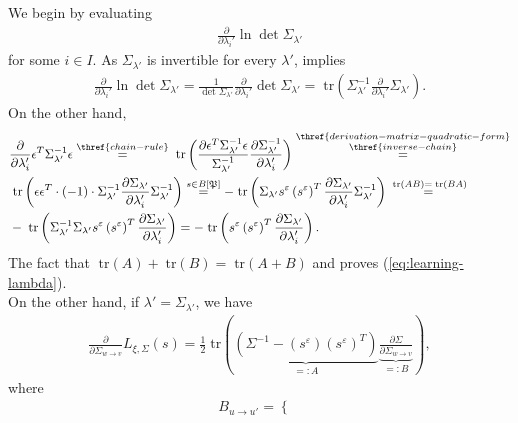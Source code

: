 \documentclass[a4paper,11pt]{report}
\newcommand{\tr}{\;\text{tr}}
\begin{document}
\begin{Bew}
We begin by evaluating
\begin{align*}
\frac{\partial}{\partial\lambda_i'}\ln\det\Sigma_{\lambda'}
\end{align*}
for some $i\in I$. As $\Sigma_{\lambda'}$ is invertible for every $\lambda'$,  implies
\begin{align*}
\frac{\partial}{\partial\lambda_i'}\ln\det\Sigma_{\lambda'}=\frac{1}{\det\Sigma_{\lambda'}}\frac{\partial}{\partial\lambda_i'}\det\Sigma_{\lambda'}=\tr\left(\Sigma_{\lambda'}^{-1}\frac{\partial}{\partial\lambda_i'}\Sigma_{\lambda'}\right).
\end{align*}
On the other hand,
\begin{align*}
&\frac{\partial}{\partial\lambda_i'}\epsilon^T\Sigma_{\lambda'}^{-1}\epsilon\overset{\thref{chain-rule}}{=}
\tr\left(\frac{\partial\epsilon^T\Sigma_{\lambda'}^{-1}\epsilon}{\Sigma^{-1}_{\lambda'}}\frac{\partial\Sigma^{-1}_{\lambda'}}{\partial\lambda_i'}\right)
\overset{\substack{\thref{derivation-matrix-quadratic-form}\\\thref{inverse-chain}}}{=}\\
&\tr\left(\epsilon\epsilon^T\cdot(-1)\cdot\Sigma_{\lambda'}^{-1}\frac{\partial\Sigma_{\lambda'}}{\partial \lambda_i'}\Sigma_{\lambda'}^{-1}\right)\overset{s\in B[\mathfrak{P}]}{=}
-\tr\left(\Sigma_{\lambda'} s^{\varepsilon}\left(s^{\varepsilon}\right)^T\frac{\partial\Sigma_{\lambda'}}{\partial\lambda_i'}\Sigma_{\lambda'}^{-1}\right)\overset{\tr(AB)=\tr(BA)}{=}\\
&-\tr\left(\Sigma_{\lambda'}^{-1}\Sigma_{\lambda'}s^{\varepsilon}\left(s^{\varepsilon}\right)^T\frac{\partial\Sigma_{\lambda'}}{\partial\lambda_i'}\right)=
-\tr\left(s^{\varepsilon}\left(s^{\varepsilon}\right)^T\frac{\partial\Sigma_{\lambda'}}{\partial\lambda_i'}\right).
\end{align*}
The fact that $\tr(A)+\tr(B)=\tr(A+B)$ and  proves (\ref{eq:learning-lambda}).\\
On the other hand, if $\lambda'=\Sigma_{\lambda'}$, we have
\begin{align*}
\frac{\partial}{\partial\Sigma_{w\to v}}L_{\xi,\Sigma}(s)=
\frac12\tr\left(
\underbrace{\left(\Sigma^{-1}-\left(s^{\varepsilon}\right)\left(s^{\varepsilon}\right)^T\right)}_
{=:A}
\underbrace{\frac{\partial\Sigma}{\partial\Sigma_{w\to v}}}_{=:B}\right),
\end{align*}
where
\begin{align*}
B_{u\to u'}=\begin{cases}

\end{cases}
\end{align*}
\end{Bew}
\end{document}
